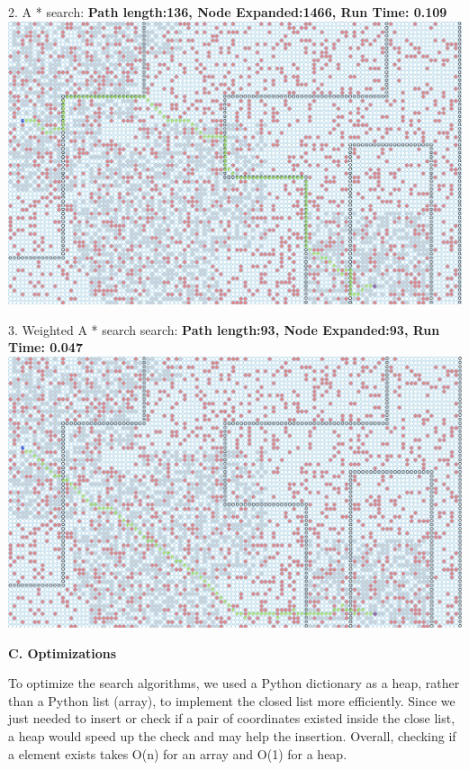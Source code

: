 \documentclass[12pt, letterpaper]{article}
\begin{document}
2. A * search: \newline
\medskip
\textbf{Path length:136, Node Expanded:1466,	Run Time: 0.109}\newline
\noindent \includegraphics[scale=0.4]{"b-map5-1-a"}\newline

3. Weighted A * search search:\newline
\medskip
\textbf{Path length:93, Node Expanded:93,	Run Time: 0.047}\newline
\noindent \includegraphics[scale=0.4]{"b-map5-1-w-2"}\newline


\pagebreak %

\noindent \textbf{C. Optimizations}

To optimize the search algorithms, we used a Python dictionary as a heap, rather than a Python list (array), to implement the closed list more efficiently. Since we just needed to insert or check if a pair of coordinates existed inside the close list, a heap would speed up the check and may help the insertion. Overall, checking if a element exists takes O(n) for an array and O(1) for a heap.
\end{document}
